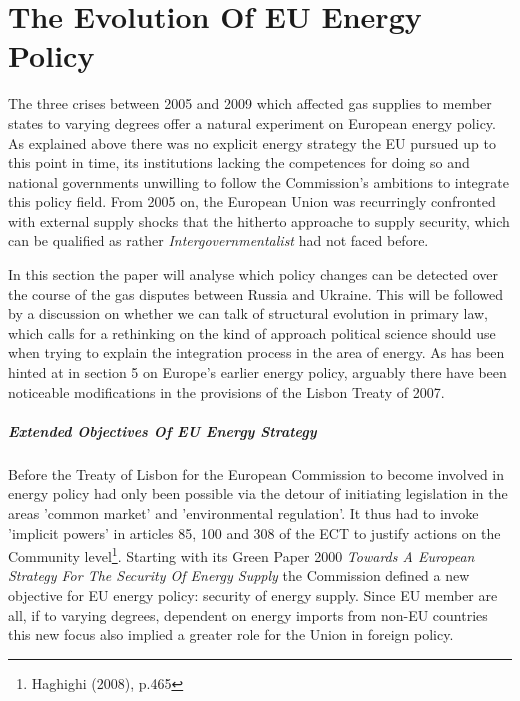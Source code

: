 \documentclass[11pt,a4paper,english]{scrreprt}
\begin{document}


\chapter{The Evolution Of EU Energy Policy}


The three crises between 2005 and 2009 which affected gas supplies to member
states to varying degrees offer a natural experiment on European energy policy.
As explained above there was no explicit energy strategy the EU pursued up to
this point in time, its institutions lacking the competences for doing so and
national governments unwilling to follow the Commission's ambitions to integrate
this policy field. From 2005 on, the European Union was recurringly confronted
with external supply shocks that the hitherto approache to supply security,
which can be qualified as rather \emph{Intergovernmentalist} had not faced
before.\par

In this section the paper will analyse which policy changes can be detected over
the course of the gas disputes between Russia and Ukraine. This will be
followed by a discussion on whether we can talk of structural evolution in
primary law, which calls for a rethinking on the kind of approach political
science should use when trying to explain the integration process in the area
of energy. As has been hinted at in section 5 on Europe's earlier energy policy,
arguably there have been noticeable modifications in the provisions of the
Lisbon Treaty of 2007.\par



  \paragraph{Extended Objectives Of EU Energy Strategy}

Before the Treaty of Lisbon for the European Commission to become involved in
energy policy had only been possible via the detour of initiating legislation in
the areas 'common market' and 'environmental regulation'. It thus had to invoke
'implicit powers' in articles 85, 100 and 308 of the ECT to justify actions on
the Community level\footnote{Haghighi (2008), p.465}. Starting with its Green
Paper 2000 \emph{Towards A European Strategy For The Security Of Energy Supply}
the Commission defined a new objective for EU energy policy: security of energy
supply. Since EU member are all, if to varying degrees, dependent on energy
imports from non-EU countries this new focus also implied a greater role for the
Union in foreign policy.\par
\end{document}
